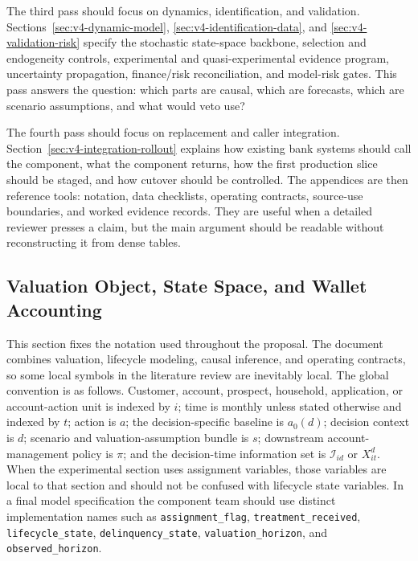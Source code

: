 \documentclass[11pt]{article}
\newcommand{\1}{\mathbf{1}}
\newcommand{\code}[1]{\nolinkurl{#1}}
\begin{document}
The third pass should focus on dynamics, identification, and validation.
Sections~\ref{sec:v4-dynamic-model}, \ref{sec:v4-identification-data}, and
\ref{sec:v4-validation-risk} specify the stochastic state-space backbone,
selection and endogeneity controls, experimental and quasi-experimental
evidence program, uncertainty propagation, finance/risk reconciliation, and
model-risk gates. This pass answers the question: which parts are causal,
which are forecasts, which are scenario assumptions, and what would veto use?

The fourth pass should focus on replacement and caller integration.
Section~\ref{sec:v4-integration-rollout} explains how existing bank systems
should call the component, what the component returns, how the first production
slice should be staged, and how cutover should be controlled. The appendices
are then reference tools: notation, data checklists, operating contracts,
source-use boundaries, and worked evidence records. They are useful when a
detailed reviewer presses a claim, but the main argument should be readable
without reconstructing it from dense tables.

\subsection{Valuation Object, State Space, and Wallet Accounting}
\label{sec:valuation-spine}

This section fixes the notation used throughout the proposal. The document
combines valuation, lifecycle modeling, causal inference, and operating
contracts, so some local symbols in the literature review are inevitably
local. The global convention is as follows. Customer, account, prospect,
household, application, or account-action unit is indexed by $i$; time is
monthly unless stated otherwise and indexed by $t$; action is $a$; the
decision-specific baseline is $a_0(d)$; decision context is $d$; scenario and
valuation-assumption bundle is $s$; downstream account-management policy is
$\pi$; and the decision-time information set is $\mathcal{I}_{id}$ or
$X_{it}^{d}$. When the experimental section uses assignment variables, those
variables are local to that section and should not be confused with lifecycle
state variables. In a final model specification the component team should use
distinct implementation names such as \code{assignment_flag},
\code{treatment_received}, \code{lifecycle_state}, \code{delinquency_state},
\code{valuation_horizon}, and \code{observed_horizon}.
\end{document}
